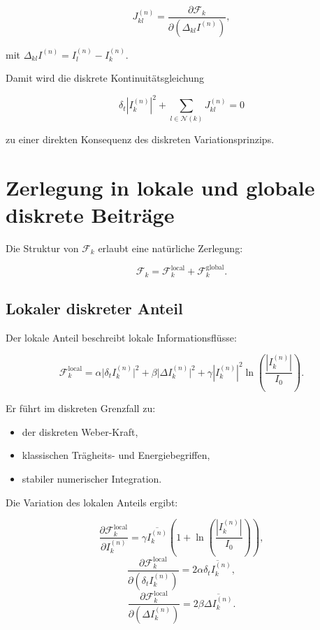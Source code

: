 \[
J_{kl}^{(n)} = \frac{\partial \mathcal{F}_k}{\partial (\Delta_{kl} I^{(n)})},
\]

mit \( \Delta_{kl} I^{(n)} = I_l^{(n)} - I_k^{(n)} \).

Damit wird die diskrete Kontinuitätsgleichung

\[
\delta_t |I_k^{(n)}|^2 + \sum_{l \in \mathcal{N}(k)} J_{kl}^{(n)} = 0
\]

zu einer direkten Konsequenz des diskreten Variationsprinzips.

\section{Zerlegung in lokale und globale diskrete Beiträge}
\label{sec:lokal_global_zerlegung}

Die Struktur von \( \mathcal{F}_k \) erlaubt eine natürliche Zerlegung:

\[
\mathcal{F}_k = \mathcal{F}_k^{\text{local}} + \mathcal{F}_k^{\text{global}}.
\]

\subsection{Lokaler diskreter Anteil}
\label{sub:lokaler_anteil}

Der lokale Anteil beschreibt lokale Informationsflüsse:

\[
\mathcal{F}_k^{\text{local}} = \alpha \bigl| \delta_t I_k^{(n)} \bigr|^2 + \beta \bigl| \Delta I_k^{(n)} \bigr|^2 + \gamma |I_k^{(n)}|^2 \ln \left( \frac{|I_k^{(n)}|}{I_0} \right).
\]

Er führt im diskreten Grenzfall zu:

\begin{itemize}
    \item der diskreten Weber-Kraft,
    \item klassischen Trägheits- und Energiebegriffen,
    \item stabiler numerischer Integration.
\end{itemize}

Die Variation des lokalen Anteils ergibt:

\[
\frac{\partial \mathcal{F}_k^{\text{local}}}{\partial I_k^{(n)}} = \gamma \overline{I_k^{(n)}} \left( 1 + \ln \left( \frac{|I_k^{(n)}|}{I_0} \right) \right),
\]
\[
\frac{\partial \mathcal{F}_k^{\text{local}}}{\partial (\delta_t I_k^{(n)})} = 2\alpha \overline{\delta_t I_k^{(n)}},
\]
\[
\frac{\partial \mathcal{F}_k^{\text{local}}}{\partial (\Delta I_k^{(n)})} = 2\beta \overline{\Delta I_k^{(n)}}.
\]

